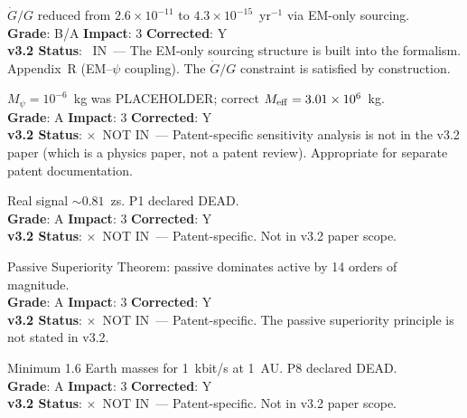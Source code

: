 \documentclass[11pt,a4paper]{article}
\newcommand{\vin}{\textcolor{statusIN}{\checkmark~IN}}
\newcommand{\vnot}{\textcolor{statusNOT}{$\times$~NOT IN}}
\begin{document}
\begin{tcolorbox}[colback=important!5,colframe=important,title=\textbf{F26: T1 ($\dot{G}/G$) Declared Genuine Falsification, Then Resolved}]
$\dot{G}/G$ reduced from $2.6 \times 10^{-11}$ to $4.3 \times 10^{-15}$~yr$^{-1}$ via EM-only sourcing.\\
\textbf{Grade}: B/A \quad \textbf{Impact}: 3 \quad \textbf{Corrected}: Y\\
\textbf{v3.2 Status}: \vin\ --- The EM-only sourcing structure is built into the formalism. Appendix~R (EM--$\psi$ coupling). The $\dot{G}/G$ constraint is satisfied by construction.
\end{tcolorbox}

\begin{tcolorbox}[colback=important!5,colframe=important,title=\textbf{F27: $M_{\rm eff}$ Propagation --- P11 Sensitivity $10^6\times$ Over-Optimistic}]
$M_\psi = 10^{-6}$~kg was PLACEHOLDER; correct $M_{\rm eff} = 3.01 \times 10^6$~kg.\\
\textbf{Grade}: A \quad \textbf{Impact}: 3 \quad \textbf{Corrected}: Y\\
\textbf{v3.2 Status}: \vnot\ --- Patent-specific sensitivity analysis is not in the v3.2 paper (which is a physics paper, not a patent review). Appropriate for separate patent documentation.
\end{tcolorbox}

\begin{tcolorbox}[colback=important!5,colframe=important,title=\textbf{F28: P1 Bubble Timing 4.0~ns KILLED}]
Real signal $\sim 0.81$~zs. P1 declared DEAD.\\
\textbf{Grade}: A \quad \textbf{Impact}: 3 \quad \textbf{Corrected}: Y\\
\textbf{v3.2 Status}: \vnot\ --- Patent-specific. Not in v3.2 paper scope.
\end{tcolorbox}

\begin{tcolorbox}[colback=important!5,colframe=important,title=\textbf{F29: P2 SQUID-Active Detection INVALIDATED}]
Passive Superiority Theorem: passive dominates active by 14 orders of magnitude.\\
\textbf{Grade}: A \quad \textbf{Impact}: 3 \quad \textbf{Corrected}: Y\\
\textbf{v3.2 Status}: \vnot\ --- Patent-specific. The passive superiority principle is not stated in v3.2.
\end{tcolorbox}

\begin{tcolorbox}[colback=important!5,colframe=important,title=\textbf{F30: P8 Communications EFFECTIVELY DEAD}]
Minimum 1.6 Earth masses for 1~kbit/s at 1~AU. P8 declared DEAD.\\
\textbf{Grade}: A \quad \textbf{Impact}: 3 \quad \textbf{Corrected}: Y\\
\textbf{v3.2 Status}: \vnot\ --- Patent-specific. Not in v3.2 paper scope.
\end{tcolorbox}
\end{document}
